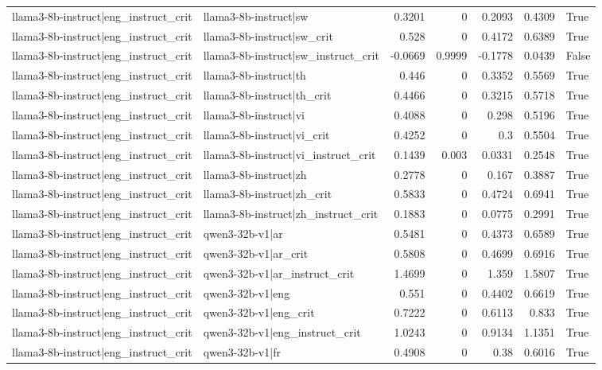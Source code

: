 \begin{table}
\begin{tabular}{l l r r r r l}
llama3-8b-instruct|eng_instruct_crit & llama3-8b-instruct|sw & 0.3201 & 0 & 0.2093 & 0.4309 & True \\
llama3-8b-instruct|eng_instruct_crit & llama3-8b-instruct|sw_crit & 0.528 & 0 & 0.4172 & 0.6389 & True \\
llama3-8b-instruct|eng_instruct_crit & llama3-8b-instruct|sw_instruct_crit & -0.0669 & 0.9999 & -0.1778 & 0.0439 & False \\
llama3-8b-instruct|eng_instruct_crit & llama3-8b-instruct|th & 0.446 & 0 & 0.3352 & 0.5569 & True \\
llama3-8b-instruct|eng_instruct_crit & llama3-8b-instruct|th_crit & 0.4466 & 0 & 0.3215 & 0.5718 & True \\
llama3-8b-instruct|eng_instruct_crit & llama3-8b-instruct|vi & 0.4088 & 0 & 0.298 & 0.5196 & True \\
llama3-8b-instruct|eng_instruct_crit & llama3-8b-instruct|vi_crit & 0.4252 & 0 & 0.3 & 0.5504 & True \\
llama3-8b-instruct|eng_instruct_crit & llama3-8b-instruct|vi_instruct_crit & 0.1439 & 0.003 & 0.0331 & 0.2548 & True \\
llama3-8b-instruct|eng_instruct_crit & llama3-8b-instruct|zh & 0.2778 & 0 & 0.167 & 0.3887 & True \\
llama3-8b-instruct|eng_instruct_crit & llama3-8b-instruct|zh_crit & 0.5833 & 0 & 0.4724 & 0.6941 & True \\
llama3-8b-instruct|eng_instruct_crit & llama3-8b-instruct|zh_instruct_crit & 0.1883 & 0 & 0.0775 & 0.2991 & True \\
llama3-8b-instruct|eng_instruct_crit & qwen3-32b-v1|ar & 0.5481 & 0 & 0.4373 & 0.6589 & True \\
llama3-8b-instruct|eng_instruct_crit & qwen3-32b-v1|ar_crit & 0.5808 & 0 & 0.4699 & 0.6916 & True \\
llama3-8b-instruct|eng_instruct_crit & qwen3-32b-v1|ar_instruct_crit & 1.4699 & 0 & 1.359 & 1.5807 & True \\
llama3-8b-instruct|eng_instruct_crit & qwen3-32b-v1|eng & 0.551 & 0 & 0.4402 & 0.6619 & True \\
llama3-8b-instruct|eng_instruct_crit & qwen3-32b-v1|eng_crit & 0.7222 & 0 & 0.6113 & 0.833 & True \\
llama3-8b-instruct|eng_instruct_crit & qwen3-32b-v1|eng_instruct_crit & 1.0243 & 0 & 0.9134 & 1.1351 & True \\
llama3-8b-instruct|eng_instruct_crit & qwen3-32b-v1|fr & 0.4908 & 0 & 0.38 & 0.6016 & True \\

\end{tabular}
\end{table}
